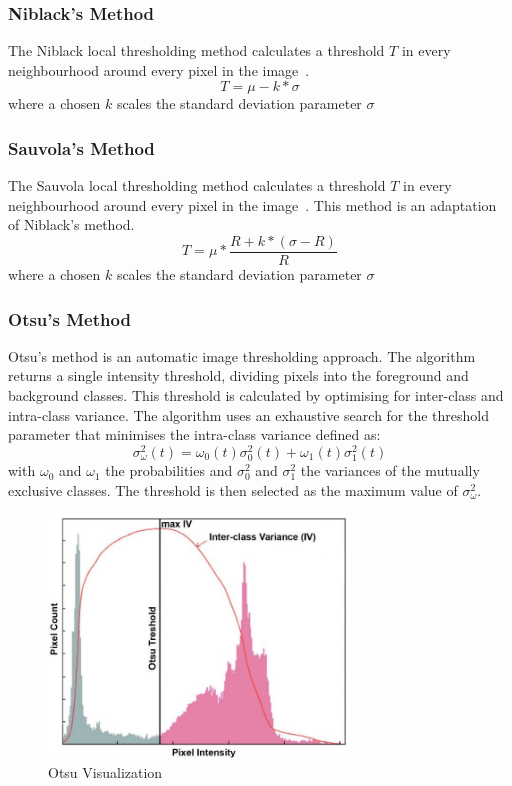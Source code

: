 \documentclass[a4paper, 12pt]{report}
\begin{document}
\subsubsection{Niblack's Method}
The Niblack local thresholding method calculates a threshold $T$ in every
neighbourhood around every pixel in the image~\cite{scikit-image}.
\[T=\mu-k*\sigma\]
where a chosen $k$ scales the standard deviation parameter $\sigma$

\subsubsection{Sauvola's Method}
The Sauvola local thresholding method calculates a threshold $T$ in every
neighbourhood around every pixel in the image~\cite{scikit-image}. This method
is an adaptation of Niblack's method.
\[T=\mu*\frac{R+k*(\sigma-R)}{R}\]
where a chosen $k$ scales the standard deviation parameter $\sigma$

\subsubsection{Otsu's Method}
Otsu's method is an automatic image thresholding approach. The algorithm
returns a single intensity threshold, dividing pixels into the foreground and
background classes. This threshold is calculated by optimising for inter-class
and intra-class variance. The algorithm uses an exhaustive search for the
threshold parameter that minimises the intra-class variance defined as:
\[\sigma_{\omega}^{2}(t)=\omega_0(t)\sigma_0^2(t)+\omega_1(t)\sigma_1^2(t)\]
with $\omega_0$ and $\omega_1$ the probabilities and $\sigma_0^2$ and
$\sigma_1^2$ the variances of the mutually exclusive classes. The threshold is
then selected as the maximum value of $\sigma_{\omega}^{2}$.
\begin{figure}[ht]
    \centering
    \includegraphics[width=8cm]{otsu.png}
    \caption{Otsu Visualization~\cite{mdpi_2020}}
    \label{fig:otsu}
\end{figure}
\end{document}
